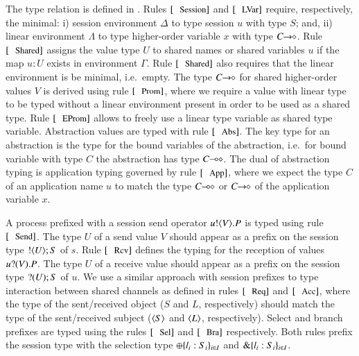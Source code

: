 The type relation is defined in .
Rules $\trule{Session}$ and $\trule{LVar}$ require,
respectively, the minimal:
i) session environment $\Delta$ to type session 
$u$ with type $S$; and,
ii) linear environment $\Lambda$ to type 
higher-order variable $x$ with type $C\!\! \rightarrow\!\! \diamond$.
Rule $\trule{Shared}$
assigns the value type $U$
to shared names or shared variables $u$ 
if the map $u:U$ exists in environment
$\Gamma$. Rule $\trule{Shared}$ also requires 
that the linear environment is
be minimal, i.e.~empty.
The type $C\!\! \rightarrow\!\! \diamond$ for shared higher-order values $V$
is derived using rule $\trule{Prom}$, where we require
a value with linear type to be typed without a linear
environment present in order to be used as a shared type.
Rule $\trule{EProm}$ allows to freely use a linear
type variable as shared type variable. 
Abstraction values are typed with rule $\trule{Abs}$.
The key type for an abstraction is the type for
the bound variables of the abstraction, i.e.~for
bound variable with type $C$ the abstraction
has type $C\!\! \multimap\!\! \diamond$.
The dual of abstraction typing is application typing
governed by rule $\trule{App}$, where we expect
the type $C$ of an application name $u$ 
to match the type $C\!\! \multimap\!\! \diamond$ or $C\!\! \rightarrow\!\! \diamond$
of the application variable $x$.

A process prefixed with a session send operator $u ! \langle V \rangle . P$
is typed using rule $\trule{Send}$.
The type $U$ of a send value $V$ should appear as a prefix
on the session type $! \langle U \rangle ; S$ of $s$.
Rule $\trule{Rcv}$
defines the typing for the 
reception of values $u ? (V) . P$.
The type $U$ of a receive value should 
appear as a prefix on the session type $? (U) ; S$ of $u$.
We use a similar approach with session prefixes
to type interaction between shared channels as defined 
in rules $\trule{Req}$ and $\trule{Acc}$,
where the type of the sent/received object 
($S$ and $L$, respectively) should
match the type of the sent/received subject
($\langle S \rangle$ and $\langle L \rangle$, respectively).
Select and branch prefixes are typed using the rules
$\trule{Sel}$ and $\trule{Bra}$ respectively. Both
rules prefix the session type with the selection
type $\oplus \{l_i: S_i\}_{i \in I}$ and
$\& \{l_i:S_i\}_{i \in I}$.

